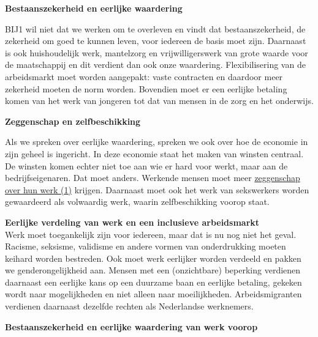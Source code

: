 \textbf{Bestaanszekerheid en eerlijke waardering}

BIJ1 wil niet dat we werken om te overleven en vindt dat
bestaanszekerheid, de zekerheid om goed te kunnen leven, voor iedereen
de basis moet zijn. Daarnaast is ook huishoudelijk werk, mantelzorg en
vrijwilligerswerk van grote waarde voor de maatschappij en dit verdient
dan ook onze waardering. Flexibilisering van de arbeidsmarkt moet worden
aangepakt: vaste contracten en daardoor meer zekerheid moeten de norm
worden. Bovendien moet er een eerlijke betaling komen van het werk van
jongeren tot dat van mensen in de zorg en het onderwijs.

\textbf{Zeggenschap en zelfbeschikking}

Als we spreken over eerlijke waardering, spreken we ook over hoe de
economie in zijn geheel is ingericht. In deze economie staat het maken
van winsten centraal. De winsten komen echter niet toe aan wie er hard
voor werkt, maar aan de bedrijfseigenaren. Dat moet anders. Werkende
mensen moet meer \underline{zeggenschap over hun werk (1)} krijgen.
Daarnaast moet ook het werk van sekswerkers worden gewaardeerd als
volwaardig werk, waarin zelfbeschikking voorop staat.

\textbf{Eerlijke verdeling van werk en een inclusieve arbeidsmarkt\\
}Werk moet toegankelijk zijn voor iedereen, maar dat is nu nog niet het
geval. Racisme, seksisme, validisme en andere vormen van onderdrukking
moeten keihard worden bestreden. Ook moet werk eerlijker worden verdeeld
en pakken we genderongelijkheid aan. Mensen met een (onzichtbare)
beperking verdienen daarnaast een eerlijke kans op een duurzame baan en
eerlijke betaling, gekeken wordt naar mogelijkheden en niet alleen naar
moeilijkheden. Arbeidsmigranten verdienen daarnaast dezelfde rechten als
Nederlandse werknemers.

\textbf{Bestaanszekerheid en eerlijke waardering van werk voorop}

